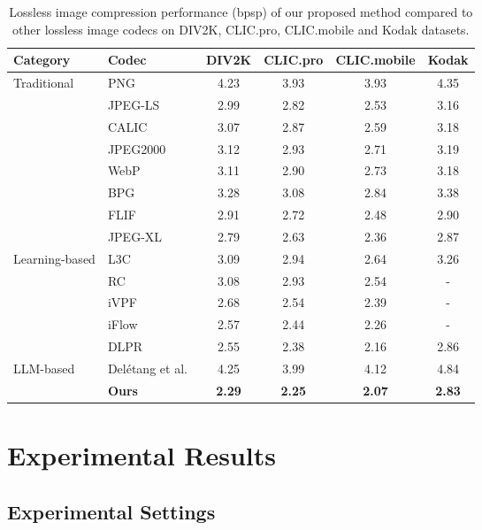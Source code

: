 \begin{table*}[t]
\tabcolsep=0.4cm
\begin{center}
\begin{tabular}{llcccc}
\toprule[2pt]
Category &Codec  &DIV2K &CLIC.pro &CLIC.mobile &Kodak\\
\midrule[1pt]
\multirow{8}{*}{Traditional} &PNG~\cite{boutell1997png}  &4.23 &3.93 &3.93 &4.35 \\
&JPEG-LS~\cite{weinberger2000loco}  &2.99 &2.82 &2.53 &3.16 \\
&CALIC~\cite{wu1997context}  &3.07 &2.87 &2.59 &3.18 \\
&JPEG2000~\cite{skodras2001jpeg}  &3.12 &2.93 &2.71 &3.19 \\
&WebP~\cite{webp_tech_report}  &3.11 &2.90 &2.73 &3.18 \\
&BPG~\cite{bpg}  &3.28 &3.08 &2.84 &3.38 \\
&FLIF~\cite{sneyers2016flif}  &2.91 &2.72 &2.48 &2.90 \\
&JPEG-XL~\cite{alakuijala2019jpeg}  &2.79 &2.63 &2.36 &2.87 \\
\midrule[1pt]
\multirow{5}{*}{Learning-based} &L3C~\cite{mentzer2019practical}  &3.09 &2.94 &2.64 &3.26 \\
&RC~\cite{mentzer2020learning}  &3.08 &2.93 &2.54 &- \\
&iVPF~\cite{zhang2021ivpf}  &2.68 &2.54 &2.39 &- \\
&iFlow~\cite{zhang2021iflow}  &2.57 &2.44 &2.26 &- \\
&DLPR~\cite{bai2024deep}  &2.55 &2.38 &2.16 &2.86 \\
\midrule[1pt]
\multirow{2}{*}{LLM-based} &Del{\'e}tang et al.~\cite{deletang2023language}  &4.25 &3.99 &4.12 &4.84 \\
&\bf Ours  &\bf2.29 &\bf2.25 &\bf2.07 &\bf2.83 \\
\bottomrule[2pt]
\end{tabular}
\caption{Lossless image compression performance (bpsp) of our proposed method compared to other lossless image codecs on DIV2K, CLIC.pro, CLIC.mobile and Kodak datasets.}
\label{tab:main-results}
\end{center}
\end{table*}

\section{Experimental Results}
\subsection{Experimental Settings}

